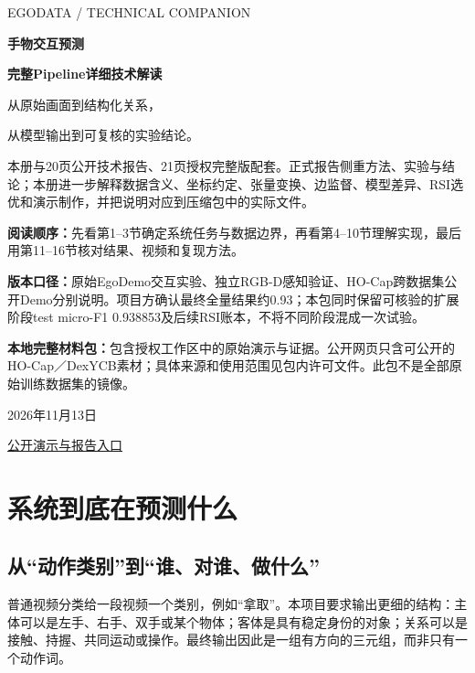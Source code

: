 \documentclass[11pt,a4paper,UTF8,fontset=fandol]{ctexart}
\begin{document}
\begin{titlepage}
\vspace*{1.5cm}
{\color{green}\large EGODATA / TECHNICAL COMPANION}\par\vspace{.8cm}
{\Huge\bfseries\color{ink}手物交互预测}\par\vspace{.35cm}
{\LARGE\bfseries 完整Pipeline详细技术解读}\par\vspace{.6cm}
{\Large 从原始画面到结构化关系，\par 从模型输出到可复核的实验结论。}\par\vspace{1.3cm}
本册与20页公开技术报告、21页授权完整版配套。正式报告侧重方法、实验与结论；本册进一步解释数据含义、坐标约定、张量变换、边监督、模型差异、RSI选优和演示制作，并把说明对应到压缩包中的实际文件。

\vspace{.4cm}
\textbf{阅读顺序：}先看第1--3节确定系统任务与数据边界，再看第4--10节理解实现，最后用第11--16节核对结果、视频和复现方法。

\textbf{版本口径：}原始EgoDemo交互实验、独立RGB-D感知验证、HO-Cap跨数据集公开Demo分别说明。项目方确认最终全量结果约0.93；本包同时保留可核验的扩展阶段test micro-F1 0.938853及后续RSI账本，不将不同阶段混成一次试验。

\textbf{本地完整材料包：}包含授权工作区中的原始演示与证据。公开网页只含可公开的HO-Cap／DexYCB素材；具体来源和使用范围见包内许可文件。此包不是全部原始训练数据集的镜像。

\vfill
{\large 2026年11月13日}\par
\href{https://egodata-full-pipeline-demo.miracle-techlink.chatgpt.site}{公开演示与报告入口}
\end{titlepage}
\tableofcontents\clearpage

\section{系统到底在预测什么}
\subsection{从“动作类别”到“谁、对谁、做什么”}
普通视频分类给一段视频一个类别，例如“拿取”。本项目要求输出更细的结构：主体可以是左手、右手、双手或某个物体；客体是具有稳定身份的对象；关系可以是接触、持握、共同运动或操作。最终输出因此是一组有方向的三元组，而非只有一个动作词。
\end{document}
